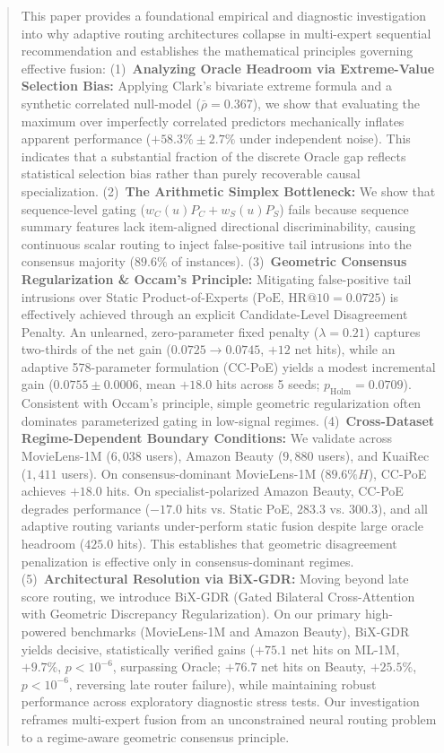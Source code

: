 \documentclass[sigconf,nonacm]{acmart}
\begin{document}
\begin{abstract}
This paper provides a foundational empirical and diagnostic investigation into why adaptive routing architectures collapse in multi-expert sequential recommendation and establishes the mathematical principles governing effective fusion:
(1)~\textbf{Analyzing Oracle Headroom via Extreme-Value Selection Bias:} Applying Clark's bivariate extreme formula and a synthetic correlated null-model ($\bar{\rho} = 0.367$), we show that evaluating the maximum over imperfectly correlated predictors mechanically inflates apparent performance ($+58.3\% \pm 2.7\%$ under independent noise). This indicates that a substantial fraction of the discrete Oracle gap reflects statistical selection bias rather than purely recoverable causal specialization.
(2)~\textbf{The Arithmetic Simplex Bottleneck:} We show that sequence-level gating ($w_C(u) P_C + w_S(u) P_S$) fails because sequence summary features lack item-aligned directional discriminability, causing continuous scalar routing to inject false-positive tail intrusions into the consensus majority ($89.6\%$ of instances).
(3)~\textbf{Geometric Consensus Regularization \& Occam's Principle:} Mitigating false-positive tail intrusions over Static Product-of-Experts ($\text{PoE}$, $\text{HR@10} = 0.0725$) is effectively achieved through an explicit Candidate-Level Disagreement Penalty. An unlearned, zero-parameter fixed penalty ($\lambda=0.21$) captures two-thirds of the net gain ($0.0725 \to 0.0745$, $+12$ net hits), while an adaptive 578-parameter formulation (CC-PoE) yields a modest incremental gain ($0.0755 \pm 0.0006$, mean $+18.0$ hits across 5 seeds; $p_{\text{Holm}} = 0.0709$). Consistent with Occam's principle, simple geometric regularization often dominates parameterized gating in low-signal regimes.
(4)~\textbf{Cross-Dataset Regime-Dependent Boundary Conditions:} We validate across MovieLens-1M ($6{,}038$ users), Amazon Beauty ($9{,}880$ users), and KuaiRec ($1{,}411$ users). On consensus-dominant MovieLens-1M ($89.6\% H$), CC-PoE achieves $+18.0$ hits. On specialist-polarized Amazon Beauty, CC-PoE degrades performance ($-17.0$ hits vs. Static PoE, $283.3$ vs. $300.3$), and all adaptive routing variants under-perform static fusion despite large oracle headroom ($425.0$ hits). This establishes that geometric disagreement penalization is effective only in consensus-dominant regimes.
(5)~\textbf{Architectural Resolution via BiX-GDR:} Moving beyond late score routing, we introduce BiX-GDR (Gated Bilateral Cross-Attention with Geometric Discrepancy Regularization). On our primary high-powered benchmarks (MovieLens-1M and Amazon Beauty), BiX-GDR yields decisive, statistically verified gains ($+75.1$ net hits on ML-1M, $+9.7\%$, $p < 10^{-6}$, surpassing Oracle; $+76.7$ net hits on Beauty, $+25.5\%$, $p < 10^{-6}$, reversing late router failure), while maintaining robust performance across exploratory diagnostic stress tests.
Our investigation reframes multi-expert fusion from an unconstrained neural routing problem to a regime-aware geometric consensus principle.
\end{abstract}
\end{document}
